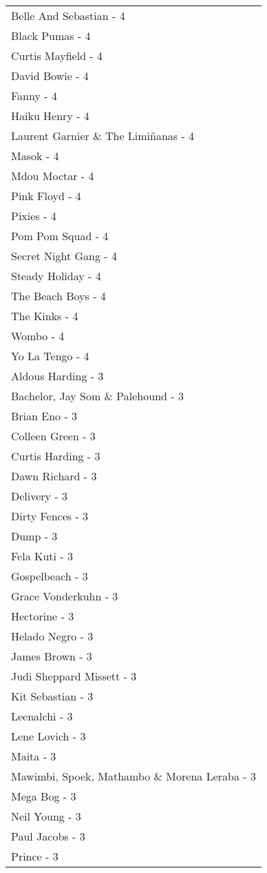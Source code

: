 \documentclass[
]{article}
\begin{document}
\begin{longtable}{l}
Belle And Sebastian - 4 \\ 
Black Pumas - 4 \\ 
Curtis Mayfield - 4 \\ 
David Bowie - 4 \\ 
Fanny - 4 \\ 
Haiku Henry - 4 \\ 
Laurent Garnier \& The Limiñanas - 4 \\ 
Masok - 4 \\ 
Mdou Moctar - 4 \\ 
Pink Floyd - 4 \\ 
Pixies - 4 \\ 
Pom Pom Squad - 4 \\ 
Secret Night Gang - 4 \\ 
Steady Holiday - 4 \\ 
The Beach Boys - 4 \\ 
The Kinks - 4 \\ 
Wombo - 4 \\ 
Yo La Tengo - 4 \\ 
Aldous Harding - 3 \\ 
Bachelor, Jay Som \& Palehound - 3 \\ 
Brian Eno - 3 \\ 
Colleen Green - 3 \\ 
Curtis Harding - 3 \\ 
Dawn Richard - 3 \\ 
Delivery - 3 \\ 
Dirty Fences - 3 \\ 
Dump - 3 \\ 
Fela Kuti - 3 \\ 
Gospelbeach - 3 \\ 
Grace Vonderkuhn - 3 \\ 
Hectorine - 3 \\ 
Helado Negro - 3 \\ 
James Brown - 3 \\ 
Judi Sheppard Missett - 3 \\ 
Kit Sebastian - 3 \\ 
Leenalchi - 3 \\ 
Lene Lovich - 3 \\ 
Maita - 3 \\ 
Mawimbi, Spoek, Mathambo \& Morena Leraba - 3 \\ 
Mega Bog - 3 \\ 
Neil Young - 3 \\ 
Paul Jacobs - 3 \\ 
Prince - 3 \\ 

\end{longtable}
\end{document}
